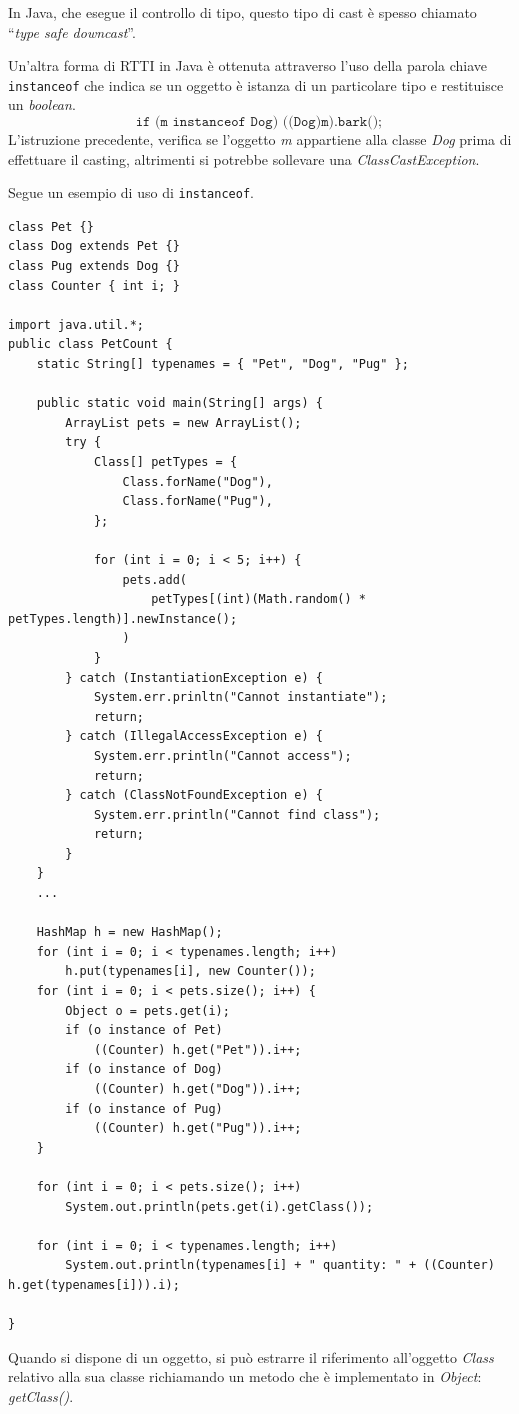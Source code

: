 \documentclass[12pt]{report}
\begin{document}
In Java, che esegue il controllo di tipo, questo tipo di cast è spesso chiamato ``\textit{type safe downcast}''.

Un'altra forma di RTTI in Java è ottenuta attraverso l'uso della parola chiave \texttt{instanceof} che indica se un oggetto è istanza di un particolare tipo e restituisce un \textit{boolean}.
\[
\texttt{if (m instanceof Dog)  ((Dog)m).bark()};
\]
L'istruzione precedente, verifica se l'oggetto \textit{m} appartiene alla classe \textit{Dog} prima di effettuare il casting, altrimenti si potrebbe sollevare una \textit{ClassCastException}.

Segue un esempio di uso di \texttt{instanceof}.
\begin{lstlisting}[style=javastyle]
class Pet {}
class Dog extends Pet {}
class Pug extends Dog {}
class Counter { int i; }

import java.util.*;
public class PetCount {
	static String[] typenames = { "Pet", "Dog", "Pug" };

	public static void main(String[] args) {
		ArrayList pets = new ArrayList();
		try {
			Class[] petTypes = {
				Class.forName("Dog"),
				Class.forName("Pug"),
			};

			for (int i = 0; i < 5; i++) {
				pets.add(
					petTypes[(int)(Math.random() * petTypes.length)].newInstance();
				)
			}
		} catch (InstantiationException e) {
			System.err.prinltn("Cannot instantiate");
			return;
		} catch (IllegalAccessException e) {
			System.err.println("Cannot access");
			return;
		} catch (ClassNotFoundException e) {
			System.err.println("Cannot find class");
			return;
		}
	}
	...

	HashMap h = new HashMap();
	for (int i = 0; i < typenames.length; i++)
		h.put(typenames[i], new Counter());
	for (int i = 0; i < pets.size(); i++) {
		Object o = pets.get(i);
		if (o instance of Pet)
			((Counter) h.get("Pet")).i++;
		if (o instance of Dog)
			((Counter) h.get("Dog")).i++;
		if (o instance of Pug)
			((Counter) h.get("Pug")).i++;
	}

	for (int i = 0; i < pets.size(); i++)
		System.out.println(pets.get(i).getClass());

	for (int i = 0; i < typenames.length; i++)
		System.out.println(typenames[i] + " quantity: " + ((Counter) h.get(typenames[i])).i);

}
\end{lstlisting}
Quando si dispone di un oggetto, si può estrarre il riferimento all'oggetto \textit{Class} relativo alla sua classe richiamando un metodo che è implementato in \textit{Object}: \textit{getClass()}.
\end{document}
